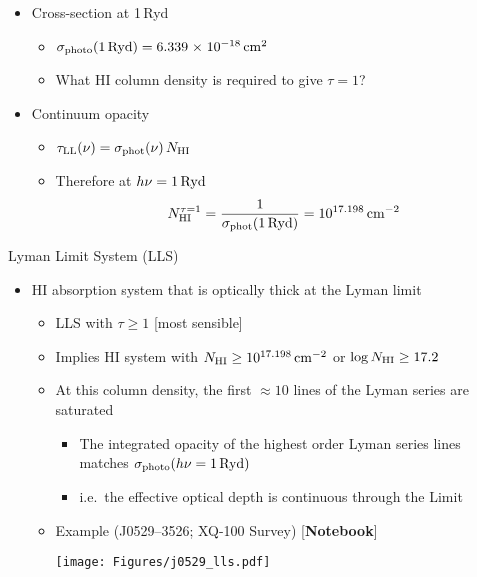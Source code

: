 \documentclass[12pt,letterpaper]{article}
\begin{document}
\begin{Aenumerate}
\begin{itemize}
 \item Cross-section at 1\,Ryd
 	\begin{itemize}
 	\item $\sigma_{\rm photo}(1\,{\rm Ryd}) = 6.339 {\; \times \; 10^{-18}} \, {\rm cm^{2}}$
 	\item What HI column density is required to give $\tau = 1$?
 	\end{itemize}
 \item Continuum opacity
 	\begin{itemize}
 	\item $\tau_{\rm LL}(\nu) = \sigma_{\rm phot}(\nu) \, N_{\rm HI}$
 	\item Therefore at $h\nu = 1\, {\rm Ryd}$
 	\begin{equation}
 	N_{\rm HI}^{\tau = 1} = \frac{1}{\sigma_{\rm phot}(1\,{\rm Ryd})} = 10^{17.198} \, {\rm cm^{-2}}
 	\end{equation}
 	\end{itemize}

  \end{itemize}

 \clearpage

{\bf \item Lyman Limit System (LLS)}
  \begin{itemize}
  \item HI absorption system that is optically thick at the Lyman limit
  	\begin{itemize}
  	\item LLS with $\tau \ge 1$ [most sensible]
  	\item Implies HI system with $N_{\rm HI} \ge 10^{17.198} \, {\rm cm^{-2}}$ or 
  	$\log N_{\rm HI} \ge 17.2$
  	\item At this column density, the first $\approx 10$ lines of the
  	Lyman series are saturated
  		\begin{itemize}
  		\item The integrated opacity of the highest order Lyman series lines
  		matches $\sigma_{\rm photo}(h\nu = 1 \, \rm Ryd)$
  		\item i.e.\ the effective optical depth is continuous through the Limit
  		\end{itemize}
  	\item Example (J0529--3526; XQ-100 Survey) [{\bf Notebook}]

	\texttt{[image: Figures/j0529\_lls.pdf]}


\end{itemize}
\end{itemize}
\end{Aenumerate}
\end{document}
